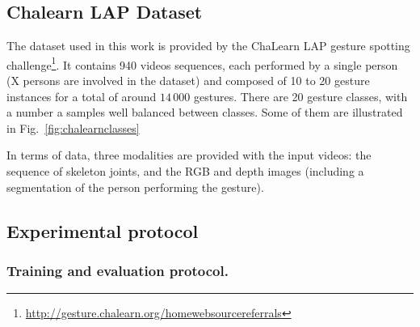 \subsection{Chalearn LAP Dataset} 
\label{sec:chalearn}


The dataset used in this work is provided by the ChaLearn LAP \cite{chalearnLAP} gesture spotting challenge\footnote{\href{http://gesture.chalearn.org/homewebsourcereferrals}{http://gesture.chalearn.org/homewebsourcereferrals}}.
%
It contains 940 videos sequences, each performed by a single person (X persons are involved in the dataset) 
and composed of 10 to 20 gesture instances for a total of around $14\,000$ gestures.
%
There are 20 gesture classes, with a number a samples well balanced between classes. Some of them are illustrated in Fig.~\ref{fig:chalearnclasses}

In terms of data, three modalities are provided with the input videos: the sequence of skeleton joints, and the RGB and depth images 
(including a segmentation of the person performing the gesture). 




\subsection{Experimental protocol}

\subsubsection{Training and evaluation protocol.}

